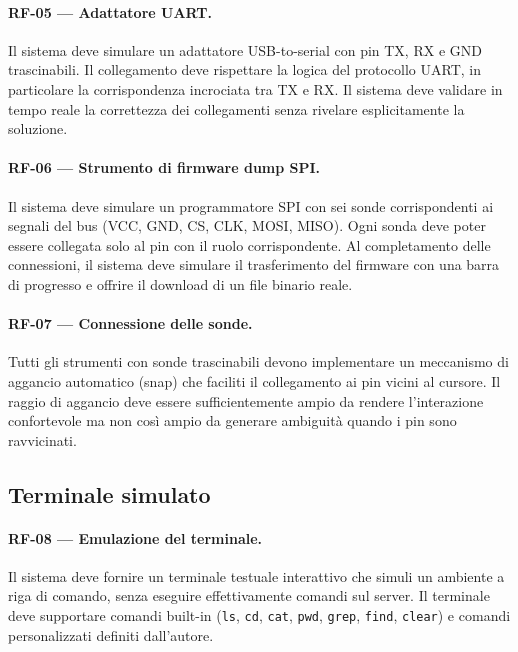 \paragraph{RF-05 --- Adattatore UART.} Il sistema deve simulare un adattatore USB-to-serial con pin TX, RX e GND trascinabili. Il collegamento deve rispettare la logica del protocollo UART, in particolare la corrispondenza incrociata tra TX e RX. Il sistema deve validare in tempo reale la correttezza dei collegamenti senza rivelare esplicitamente la soluzione.

\paragraph{RF-06 --- Strumento di firmware dump SPI.} Il sistema deve simulare un programmatore SPI con sei sonde corrispondenti ai segnali del bus (VCC, GND, CS, CLK, MOSI, MISO). Ogni sonda deve poter essere collegata solo al pin con il ruolo corrispondente. Al completamento delle connessioni, il sistema deve simulare il trasferimento del firmware con una barra di progresso e offrire il download di un file binario reale.

\paragraph{RF-07 --- Connessione delle sonde.} Tutti gli strumenti con sonde trascinabili devono implementare un meccanismo di aggancio automatico (snap) che faciliti il collegamento ai pin vicini al cursore. Il raggio di aggancio deve essere sufficientemente ampio da rendere l'interazione confortevole ma non così ampio da generare ambiguità quando i pin sono ravvicinati.

\subsection{Terminale simulato}
\label{subsec:rf-terminale}

\paragraph{RF-08 --- Emulazione del terminale.} Il sistema deve fornire un terminale testuale interattivo che simuli un ambiente a riga di comando, senza eseguire effettivamente comandi sul server. Il terminale deve supportare comandi built-in (\texttt{ls}, \texttt{cd}, \texttt{cat}, \texttt{pwd}, \texttt{grep}, \texttt{find}, \texttt{clear}) e comandi personalizzati definiti dall'autore.

